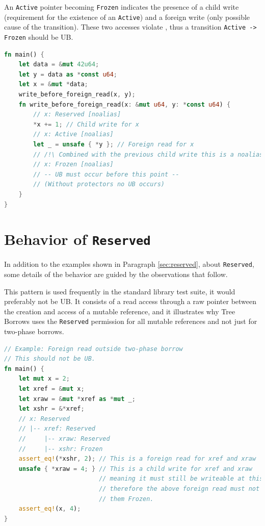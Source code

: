 \documentclass[a4paper,11pt]{article}
\theoremstyle{plain}
\theoremstyle{definition}
\theoremstyle{remark}
\newcommand{\tcode}[1]{\rstinline{#1}}
\newcommand{\tperm}[1]{\texttt{#1}}
\begin{document}
An \tperm{Active} pointer becoming \tperm{Frozen} indicates the presence of a child write
(requirement for the existence of an \tperm{Active}) and a foreign write (only possible cause
of the transition). These two accesses violate \tcode{noalias}, thus a transition \tperm{Active -> Frozen}
should be UB.

\begin{lstlisting}[language=rust]
fn main() {
    let data = &mut 42u64;
    let y = data as *const u64;
    let x = &mut *data;
    write_before_foreign_read(x, y);
    fn write_before_foreign_read(x: &mut u64, y: *const u64) {
        // x: Reserved [noalias]
        *x += 1; // Child write for x
        // x: Active [noalias]
        let _ = unsafe { *y }; // Foreign read for x
        // /!\ Combined with the previous child write this is a noalias violation
        // x: Frozen [noalias]
        // -- UB must occur before this point --
        // (Without protectors no UB occurs)
    }
}
\end{lstlisting}

\newpage
\section{Behavior of \tperm{Reserved}}
\label{app:reserved}

In addition to the examples shown in Paragraph \ref{sec:reserved}, about
\tperm{Reserved}, some details of the behavior are guided by the observations
that follow.

This pattern is used frequently in the standard library test suite,
it would preferably not be UB.
It consists of a read access through a raw pointer between the creation
and access of a mutable reference, and it illustrates why Tree Borrows
uses the \tperm{Reserved} permission for all mutable references and not
just for two-phase borrows.
\begin{lstlisting}[language=rust]
// Example: Foreign read outside two-phase borrow
// This should not be UB.
fn main() {
    let mut x = 2;
    let xref = &mut x;
    let xraw = &mut *xref as *mut _;
    let xshr = &*xref;
    // x: Reserved
    // |-- xref: Reserved
    //     |-- xraw: Reserved
    //     |-- xshr: Frozen
    assert_eq!(*xshr, 2); // This is a foreign read for xref and xraw
    unsafe { *xraw = 4; } // This is a child write for xref and xraw
                          // meaning it must still be writeable at this point,
                          // therefore the above foreign read must not have turned
                          // them Frozen.
    assert_eq!(x, 4);
}
\end{lstlisting}
\end{document}
